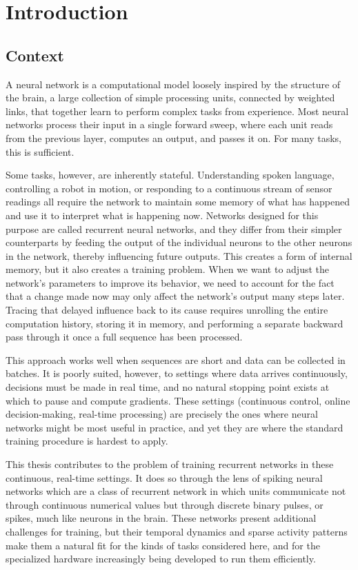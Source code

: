 
\chapter{Introduction}
\label{ch:introduction}

\section{Context}
\label{sec:context}

A neural network is a computational model loosely inspired by the structure of the brain, a large collection of simple processing units, connected by weighted links, that together learn to perform complex tasks from experience. Most neural networks process their input in a single forward sweep, where each unit reads from the previous layer, computes an output, and passes it on. For many tasks, this is sufficient.

Some tasks, however, are inherently stateful. Understanding spoken language, controlling a robot in motion, or responding to a continuous stream of sensor readings all require the network to maintain some memory of what has happened and use it to interpret what is happening now. Networks designed for this purpose are called recurrent neural networks, and they differ from their simpler counterparts by feeding the output of the individual neurons to the other neurons in the network, thereby influencing future outputs. This creates a form of internal memory, but it also creates a training problem. When we want to adjust the network's parameters to improve its behavior, we need to account for the fact that a change made now may only affect the network's output many steps later. Tracing that delayed influence back to its cause requires unrolling the entire computation history, storing it in memory, and performing a separate backward pass through it once a full sequence has been processed.

This approach works well when sequences are short and data can be collected in batches. It is poorly suited, however, to settings where data arrives continuously, decisions must be made in real time, and no natural stopping point exists at which to pause and compute gradients. These settings (continuous control, online decision-making, real-time processing) are precisely the ones where neural networks might be most useful in practice, and yet they are where the standard training procedure is hardest to apply.

This thesis contributes to the problem of training recurrent networks in these continuous, real-time settings. It does so through the lens of spiking neural networks which are a class of recurrent network in which units communicate not through continuous numerical values but through discrete binary pulses, or spikes, much like neurons in the brain. These networks present additional challenges for training, but their temporal dynamics and sparse activity patterns make them a natural fit for the kinds of tasks considered here, and for the specialized hardware increasingly being developed to run them efficiently.

